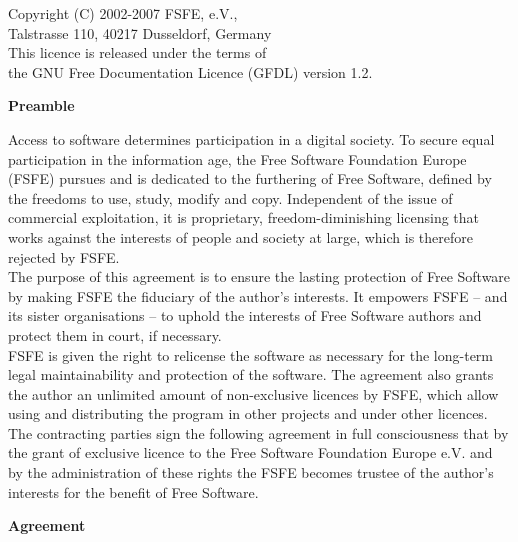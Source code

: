 \begin{center}
\sc\small Copyright (C) 2002-2007 FSFE, e.V.,\\
\sc\small Talstrasse 110,
40217 Dusseldorf,
Germany\\
\sc\small This licence is released under the terms of\\
the GNU Free Documentation Licence (GFDL) version 1.2.
\end{center}


\begin{center}
{\Large\bf Preamble}
\end{center}
 
Access to software determines participation in a digital society. To
secure equal participation in the information age, the Free Software
Foundation Europe (FSFE) pursues and is dedicated to the furthering of
Free Software, defined by the freedoms to use, study, modify and
copy. Independent of the issue of commercial exploitation, it is
proprietary, freedom-diminishing licensing that works against the
interests of people and society at large, which is therefore rejected
by FSFE.\\

The purpose of this agreement is to ensure the lasting protection of
Free Software by making FSFE the fiduciary of the author's interests.
It empowers FSFE -- and its sister organisations -- to uphold the
interests of Free Software authors and protect them in court, if
necessary.\\

FSFE is given the right to relicense the software as necessary for the
long-term legal maintainability and protection of the software. The
agreement also grants the author an unlimited amount of non-exclusive
licences by FSFE, which allow using and distributing the program in
other projects and under other licences. \\

The contracting parties sign the following agreement in full
consciousness that by the grant of exclusive licence to the Free
Software Foundation Europe e.V. and by the administration of these
rights the FSFE becomes trustee of the author's interests for
the benefit of Free Software.\\ 

\pagebreak
\begin{center}
{\Large\bf Agreement}
\end{center}

